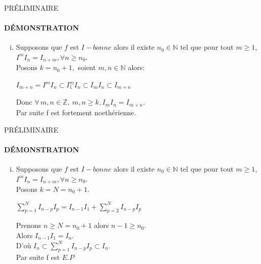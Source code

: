 \documentclass[11pt,a4paper]{beamer}
\begin{document}
		\begin{frame}{PRÉLIMINAIRE}
		\framesubtitle{DÉMONSTRATION}
		\begin{block}{}
			\begin{enumerate}[(iii)]
				\item Supposons que $f$ est $I-bonne$ alors il existe $n_0 \in \mathbb{N}$ tel que pour tout $m\geqslant 1 $, $I^mI_n = I_{n+m}, \forall n \geqslant n_0.$\\
				Posons $k=n_0+1,$ soient $m,n \in \mathbb{N}$ alors:\\
				\begin{center}
					$I_{m+n}=I^mI_n \subset I_1^mI_n \subset I_mI_n \subset I_{m+n}$
				\end{center}
				Donc $ \forall \, m, n \in \mathbb{Z}, \ m, n \geqslant k, I_m I_n = I_{m+n}$.\\
				Par suite f est fortement noethérienne.
			\end{enumerate}
		\end{block}
	\end{frame}
			\begin{frame}{PRÉLIMINAIRE}
		\framesubtitle{DÉMONSTRATION}
		\begin{block}{}
			\begin{enumerate}[(iv)]
				\item Supposons que $f$ est $I-bonne$ alors il existe $n_0 \in \mathbb{N}$ tel que pour tout $m\geqslant 1 $, $I^mI_n = I_{n+m}, \forall n \geqslant n_0.$\\
				Posons $k=N=n_0+1$.
				\begin{center}
					$\sum\limits_{p=1}^{N} I_{n-p}I_p= I_{n-1}I_1 + \sum\limits_{p=2}^{N} I_{n-p}I_p$
				\end{center}
				Prenons $n \geqslant N=n_0+1$ alors $n-1 \geqslant n_0$.\\
				Alors $I_{n-1}I_1=I_n$.\\
				D'où $I_n \subset \sum\limits_{p=1}^{N} I_{n-p}I_p \subset I_n$.\\
				Par suite f est $E.P$
			\end{enumerate}
		\end{block}
	\end{frame}
	
\end{document}
